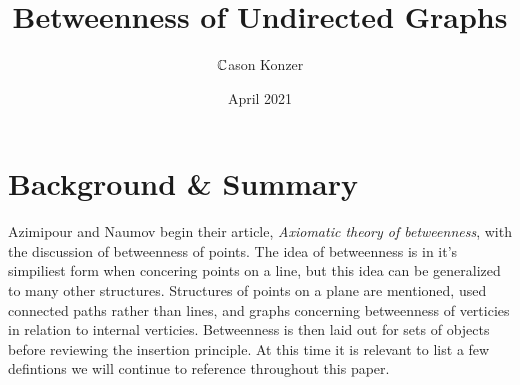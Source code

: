 \documentclass[a4paper,man,natbib]{apa6}
\title{Betweenness of Undirected Graphs}
\author{$ \mathbb{C} $ason Konzer}
\date{April 2021}
\affiliation{University of Michigan \\ Mathematics}
\begin{document}
\maketitle

\section{Background \& Summary}
\label{sec: The Lay of The Land}
      Azimipour and Naumov begin their article, \textit{Axiomatic theory of betweenness}, with the discussion of betweenness of points. 
The idea of betweenness is in it's simpiliest form when concering points on a line, but this idea can be generalized to many other structures. 
Structures of points on a plane are mentioned, used connected paths rather than lines, and graphs concerning betweenness of verticies in relation to internal verticies. 
Betweenness is then laid out for sets of objects before reviewing the insertion principle. At this time it is relevant to list a few defintions we will continue to reference throughout this paper.
\end{document}
